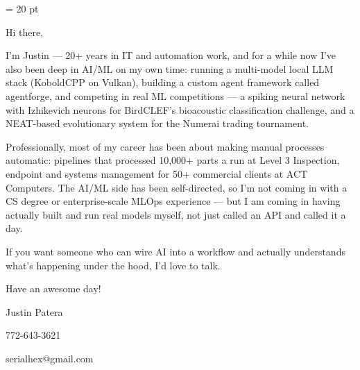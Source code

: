 \parindent = 20 pt

Hi there,

\smallskip

I'm Justin — 20+ years in IT and automation work, and for a while now I've
also been deep in AI/ML on my own time: running a multi-model local LLM
stack (KoboldCPP on Vulkan), building a custom agent framework called
agentforge, and competing in real ML competitions — a spiking neural network
with Izhikevich neurons for BirdCLEF's bioacoustic classification challenge,
and a NEAT-based evolutionary system for the Numerai trading tournament.

\smallskip

Professionally, most of my career has been about making manual processes
automatic: pipelines that processed 10,000+ parts a run at Level 3
Inspection, endpoint and systems management for 50+ commercial clients at
ACT Computers. The AI/ML side has been self-directed, so I'm not coming in
with a CS degree or enterprise-scale MLOps experience — but I am coming in
having actually built and run real models myself, not just called an API
and called it a day.

\smallskip

If you want someone who can wire AI into a workflow and actually understands
what's happening under the hood, I'd love to talk.

\smallskip

Have an awesome day!

\smallskip

Justin Patera

772-643-3621

serialhex@gmail.com
